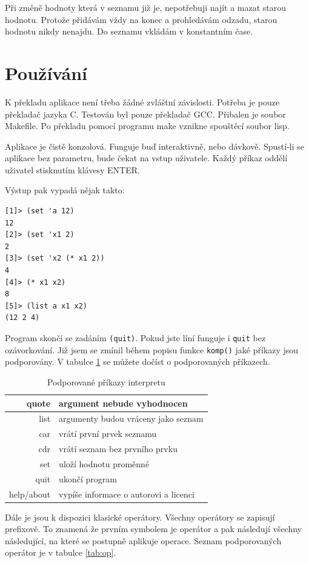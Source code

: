 \documentclass[a4paper, 12pt]{article}
\begin{document}
Při změně hodnoty která v seznamu již je, nepotřebuji najít a mazat
starou hodnotu. Protože přidávám vždy na konec a prohledávám odzadu,
starou hodnotu nikdy nenajdu. Do seznamu vkládám v konstantním čase.

\section{Používání}
K překladu aplikace není třeba žádné zvláštní závislosti. Potřeba je
pouze překladač jazyka C. Testován byl pouze překladač \textsf{GCC}.
Přibalen je soubor \textsf{Makefile}. Po překladu pomocí programu
\textsf{make} vznikne spouštěcí soubor \textsf{lisp}.

Aplikace je čistě konzolová. Funguje buď interaktivně, nebo
dávkově. Spustí-li se aplikace bez parametru, bude čekat na vstup
uživatele. Každý příkaz oddělí uživatel stisknutím klávesy ENTER.

Výstup pak vypadá nějak takto:
\begin{verbatim}
[1]> (set 'a 12)
12
[2]> (set 'x1 2)
2
[3]> (set 'x2 (* x1 2))
4
[4]> (* x1 x2)
8
[5]> (list a x1 x2)
(12 2 4)
\end{verbatim}

Program skončí se zadáním \texttt{(quit)}. Pokud jste líní funguje i
\texttt{quit} bez ozávorkování. Již jsem se zmínil během popisu funkce
\texttt{komp()} jaké příkazy jsou podporovány. V tabulce \ref{tab:prik}
se můžete dočíst o podporovaných příkazech.

\begin{table}
\centering
\begin{tabular}{|r|l|}
\hline
quote & argument nebude vyhodnocen\\ \hline
list & argumenty budou vráceny jako seznam\\ \hline
car & vrátí první prvek seznamu\\ \hline
cdr & vrátí seznam bez prvního prvku\\ \hline
set & uloží hodnotu proměnné\\ \hline
quit & ukončí program\\ \hline
help/about & vypíše informace o autorovi a licenci\\
\hline
\end{tabular}
\caption{Podporované příkazy interpretu}
\label{tab:prik}
\end{table}

Dále je jsou k dispozici klasické operátory. Všechny operátory se
zapisují prefixově. To znamená že prvním symbolem je operátor a pak
následují všechny následující, na které se postupně aplikuje operace.
Seznam podporovaných operátor je v tabulce \ref{tab:op}.
\end{document}
